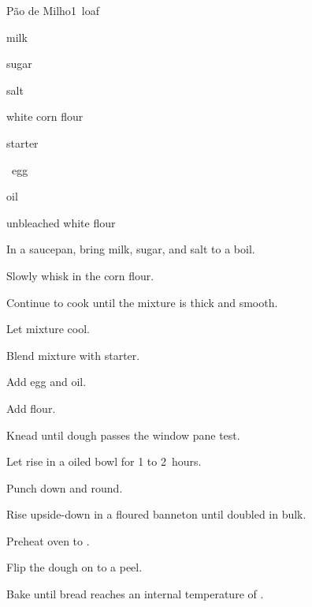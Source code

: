 \begin{recipe}{P\~ao de Milho}{}{1~loaf}

\begin{ingredients}
\item {} milk
\item \C{\quarter} sugar
\item {} salt
\item {} white corn flour
\item {} starter
\item \half{}~egg
\item {} oil
\item {} unbleached white flour
\end{ingredients}

\begin{directions}
\item In a saucepan, bring milk, sugar, and salt to a boil.
\item Slowly whisk in the corn flour.
\item Continue to cook until the mixture is thick and smooth.
\item Let mixture cool.
\item Blend mixture with starter.
\item Add egg and oil.
\item Add flour.
\item Knead until dough passes the window pane test.
\item Let rise in a oiled bowl for 1 to 2~hours.
\item Punch down and round.
\item Rise upside-down in a floured banneton until doubled in bulk.
\item Preheat oven to .
\item Flip the dough on to a peel.
\item Bake until bread reaches an internal temperature of .
\end{directions}

\end{recipe}
